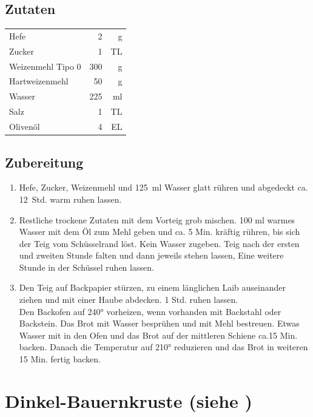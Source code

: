 \subsection*{Zutaten}
\begin{tabular}{lrr}
    Hefe               &   2 &  g \\
    Zucker             &   1 & TL \\
    Weizenmehl Tipo 0 &  300 &  g \\
    Hartweizenmehl     &  50 &  g \\
    Wasser             & 225 & ml \\
    Salz               &   1 & TL \\
    Olivenöl           &   4 & EL
\end{tabular} 


\subsection*{Zubereitung}

\begin{enumerate}
    \item Hefe, Zucker, Weizenmehl und 125 ml Wasser glatt rühren und abgedeckt ca. 12 Std. warm ruhen lassen. 
    \item Restliche trockene Zutaten mit dem Vorteig grob mischen. 100 ml
    warmes Wasser mit dem Öl zum Mehl geben und ca. 5 Min. kräftig
    rühren, bis sich der Teig vom Schüsselrand löst. Kein Wasser zugeben. Teig nach der ersten und zweiten Stunde falten  und dann jeweils stehen lassen, Eine weitere Stunde in der Schüssel ruhen lassen.
    
    \item Den Teig auf Backpapier stürzen, zu einem länglichen Laib auseinander ziehen und mit einer Haube abdecken. 1 Std. ruhen lassen.\\
    Den Backofen auf 240° vorheizen, wenn vorhanden mit Backstahl oder Backstein. Das Brot
    mit Wasser besprühen und mit Mehl bestreuen. Etwas Wasser mit in den Ofen und das Brot auf der mittleren Schiene ca.15 Min. backen. Danach die Temperatur auf 210° reduzieren und das Brot in weiteren 15 Min. fertig backen.
    
\end{enumerate}   


\section[Dinkel-Bauernkruste]{Dinkel-Bauernkruste \textmd{(siehe \cite[170]{SonjaBauer2021})}}    

